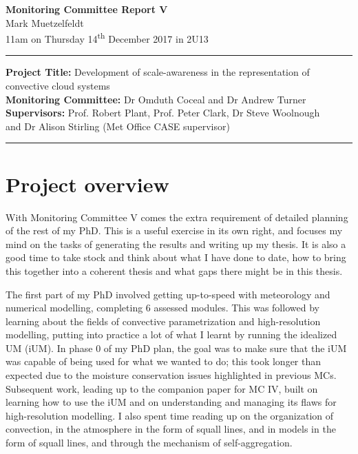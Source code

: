 \documentclass[11pt,a4paper]{article}
\newcommand{\ts}{\textsuperscript}
\begin{document}

\begin{center}
    \Large{\textbf{Monitoring Committee Report V}}\\[0.1cm]
    \large{Mark Muetzelfeldt}\\
    \normalsize{11am on Thursday 14\ts{th} December 2017 in 2U13}\\[0.1cm]		
    \rule{\textwidth}{0.2mm}
    \textbf{Project Title: }Development of scale-awareness in the representation of
    convective cloud systems\\
    \textbf{Monitoring Committee: }Dr Omduth Coceal and  Dr Andrew Turner\\
    \textbf{Supervisors: }Prof. Robert Plant, Prof. Peter Clark, Dr Steve Woolnough \\
    and Dr Alison Stirling (Met Office CASE supervisor)\\
    \rule{\textwidth}{0.2mm}
\end{center}

\section{Project overview}
\label{sec:Project Overview}

With Monitoring Committee V comes the extra requirement of detailed planning of the rest of my PhD. This is a useful exercise in its own right, and focuses my mind on the tasks of generating the results and writing up my thesis. It is also a good time to take stock and think about what I have done to date, how to bring this together into a coherent thesis and what gaps there might be in this thesis.

The first part of my PhD involved getting up-to-speed with meteorology and numerical modelling, completing 6 assessed modules. This was followed by learning about the fields of convective parametrization and high-resolution modelling, putting into practice a lot of what I learnt by running the idealized UM (iUM). In phase 0 of my PhD plan, the goal was to make sure that the iUM was capable of being used for what we wanted to do; this took longer than expected due to the moisture conservation issues highlighted in previous MCs. Subsequent work, leading up to the companion paper for MC IV, built on learning how to use the iUM and on understanding and managing its flaws for high-resolution modelling. I also spent time reading up on the organization of convection, in the atmosphere in the form of squall lines, and in models in the form of squall lines, and through the mechanism of self-aggregation.
\end{document}
